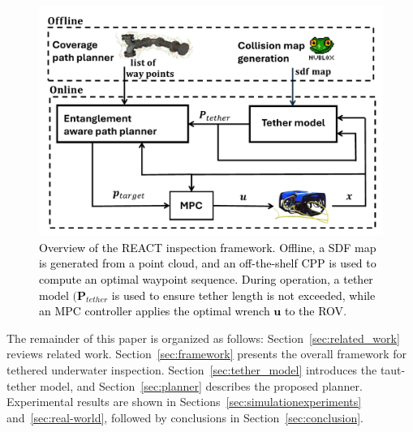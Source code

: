 %
\begin{figure}[t!]
	\centering	\includegraphics[width=1\linewidth]{EA-Planner/figures/abstract.pdf}
	  \caption{\textcolor{black}{Overview of the \ac{REACT} inspection framework. Offline, a \ac{SDF} map is generated from a point cloud, and an off-the-shelf \ac{CPP} \cite{feng2024fc} is used to compute an optimal waypoint sequence. During operation, a tether model $(\mathbf{P}_{tether}$ is used  to ensure tether length is not exceeded, while an \ac{MPC} controller applies the optimal wrench $\mathbf{u}$ to the \ac{ROV}}.}
    \label{fig:abstract}
\end{figure}
%







The remainder of this paper is organized as follows: Section~\ref{sec:related_work} reviews related work. Section~\ref{sec:framework} presents the overall framework for tethered underwater inspection. Section~\ref{sec:tether_model} introduces the taut-tether model, and Section~\ref{sec:planner} describes the proposed planner. Experimental results are shown in Sections~\ref{sec:simulationexperiments} and~\ref{sec:real-world}, followed by conclusions in Section~\ref{sec:conclusion}.






